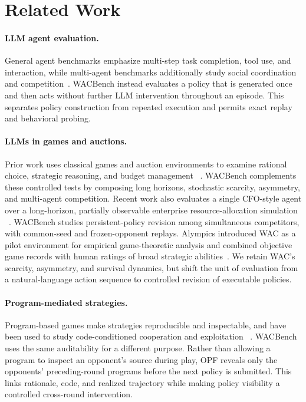 \documentclass[letterpaper]{article} %
\begin{document}
\section{Related Work}

\paragraph{LLM agent evaluation.}
General agent benchmarks emphasize multi-step task completion, tool use,
and interaction, while multi-agent benchmarks additionally study social
coordination and competition~\cite{liu2023agentbench,mialon2023gaia,zhou2024sotopia,zhu2025multiagentbench}.
WACBench instead evaluates a policy that is generated once and then acts
without further LLM intervention throughout an episode. This separates
policy construction from repeated execution and permits exact replay and
behavioral probing.

\paragraph{LLMs in games and auctions.}
Prior work uses classical games and auction environments to examine
rational choice, strategic reasoning, and budget management
~\cite{fan2024rational,duan2024gtbench,huang2025gamabench,chen2023aucarena}.
WACBench complements these controlled tests by composing long horizons,
stochastic scarcity, asymmetry, and multi-agent competition.
Recent work also evaluates a single CFO-style agent over a long-horizon,
partially observable enterprise resource-allocation simulation
~\cite{han2026enterprisearena}. WACBench studies persistent-policy revision
among simultaneous competitors, with common-seed and frozen-opponent replays.
Alympics introduced WAC as a pilot environment for empirical game-theoretic
analysis and combined objective game records with human ratings of broad
strategic abilities~\cite{mao2025alympics}. We retain WAC's scarcity,
asymmetry, and survival dynamics, but shift the unit of evaluation from a
natural-language action sequence to controlled revision of executable
policies.

\paragraph{Program-mediated strategies.}
Program-based games make strategies reproducible and inspectable, and have
been used to study code-conditioned cooperation and exploitation
~\cite{sistla2025opensourcegames}. WACBench uses the same auditability for a
different purpose. Rather than allowing a program to inspect an opponent's
source during play, OPF reveals only the opponents' preceding-round programs
before the next policy is submitted. This links rationale, code, and realized
trajectory while making policy visibility a controlled cross-round
intervention.
\end{document}
